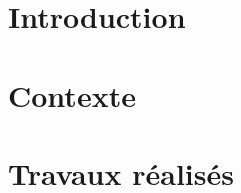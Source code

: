 \documentclass[language=fr, year=1A, enterprise=ensIIE]{ensiie-report}
\begin{document}
\renewcommand{\listfigurename}{Liste des figures}
\listoffigures\label{sec:lof}
\newpage


\renewcommand{\contentsname}{Table des matières}
\tableofcontents
\label{EndFirstPages} %
\newpage


\pagestyle{MainPages}

\section{Introduction}\label{sec:introduction}


\newpage


\section{Contexte}\label{sec:contexte}


\newpage


\section{Travaux réalisés}\label{sec:travaux_realises}


\newpage


\end{document}

